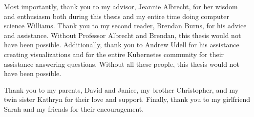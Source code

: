 Most importantly, thank you to my advisor, Jeannie Albrecht, for her wisdom and
enthusiasm both during this thesis and my entire time doing computer
science Williams. Thank you to my second reader, Brendan Burns, for his advice
and assistance. Without Professor Albrecht and Brendan, this thesis would not
have been possible. Additionally, thank you to Andrew Udell for his assistance
creating visualizations and for the entire Kubernetes community for their
assistance answering questions. Without all these people, this thesis would not
have been possible.

Thank you to my parents, David and Janice, my brother
Christopher, and my twin sister Kathryn for their love and support. Finally, thank you to
my girlfriend Sarah and my friends for their encouragement.
